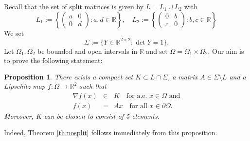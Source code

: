 \documentclass[titlepage]{amsart}
\numberwithin{equation}{section}
\theoremstyle{plain}
\newtheorem{proposition}[equation]{Proposition}
\theoremstyle{definition}
\theoremstyle{remark}
\newcommand{\R}{\mathbb{R}}
\newcommand{\gray}[1]{{\color{gray}{GRAY#1}}}
\newcommand{\g}{\nabla }
\begin{document}

Recall that the set of split matrices is given by $L=L_1 \cup L_2$ with
\begin{equation}
L_1 := \left\{  \begin{pmatrix} a & 0 \\ 0 & d 
\end{pmatrix} : a, d \in \R \right\}, \quad 
L_2 := \left\{  \begin{pmatrix} 0 & b \\ c & 0 
\end{pmatrix} : b,c \in \R \right\}
\end{equation}
We set
\begin{equation}
\Sigma := \{ Y\in\R^{2\times 2} : \det Y = 1\}.
\end{equation}
Let $\Omega_1, \Omega_2$ be bounded and open intervals in $\R$ and set $\Omega=\Omega_1\times\Omega_2$.
Our aim is to prove the following statement:  

\begin{proposition}\label{prop:nosplit}
There exists a compact set $K \subset L\cap\Sigma$, a 
matrix $A \in \Sigma \setminus L$ and a Lipschitz map $f:\overline{\Omega}\to\R^2$ such that
\begin{eqnarray}   \label{eq:Df_in_K0}  
\g f(x) &\in & K \quad \text{for a.e. $x \in \Omega$ and}\\
 \label{eq:affine_boundary0}
f(x) &=& Ax \quad \text{for  all $x \in \partial \Omega$.}
\end{eqnarray}	
Moreover, $K$ can be chosen to consist of 5 elements.
\end{proposition}

Indeed, Theorem \ref{th:nosplit} follows immediately from this proposition.
\end{document}

